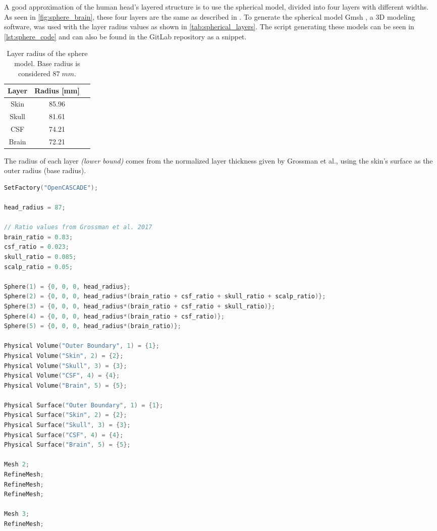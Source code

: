 A good approximation of the human head's layered structure is to use the spherical model, divided into four layers with different widths. As seen in \autoref{fig:sphere_brain}, these four layers are the same as described in . To generate the spherical model Gmsh \cite{gmsh}, a 3D modeling software, was used with the layer radius values as shown in \autoref{tab:spherical_layers}. The script generating these models can be seen in \autoref{lst:sphere_code} and can also be found in the GitLab repository \cite{thesis_repo} as a snippet.
\begin{table}[!ht]
\begin{minipage}{.62\linewidth}
\centering
\caption{Layer radius of the sphere model. Base radius is considered $87\;\si{mm}$.}
\label{tab:spherical_layers}
\begin{tabular}{|c|c|c|}
\hline
\rowcolor[HTML]{C0C0C0} 
{\color[HTML]{000000} \textbf{Layer}} & {\color[HTML]{000000} \textbf{Radius {[}mm{]}}} \\ \hline
Skin & 85.96 \\ \hline
Skull & 81.61 \\ \hline
CSF & 74.21 \\ \hline
Brain & 72.21 \\ \hline
\end{tabular}
\end{minipage}
\end{table}

\noindent The radius of each layer \textit{(lower bound)} comes from the normalized layer thickness given by Grossman et al.\cite[Figure S2, J, and K]{Grossman2017}, using the skin's surface as the outer radius (base radius).

\begin{lstlisting}[language=C,caption={Sphere \gls{CAD} model generation code in \texttt{geo} format},captionpos=b, label=lst:sphere_code]
SetFactory("OpenCASCADE");

head_radius = 87;

// Ratio values from Grossman et al. 2017
brain_ratio = 0.83;
csf_ratio = 0.023;
skull_ratio = 0.085;
scalp_ratio = 0.05;

Sphere(1) = {0, 0, 0, head_radius};
Sphere(2) = {0, 0, 0, head_radius*(brain_ratio + csf_ratio + skull_ratio + scalp_ratio)};
Sphere(3) = {0, 0, 0, head_radius*(brain_ratio + csf_ratio + skull_ratio)};
Sphere(4) = {0, 0, 0, head_radius*(brain_ratio + csf_ratio)};
Sphere(5) = {0, 0, 0, head_radius*(brain_ratio)};

Physical Volume("Outer Boundary", 1) = {1};
Physical Volume("Skin", 2) = {2};
Physical Volume("Skull", 3) = {3};
Physical Volume("CSF", 4) = {4};
Physical Volume("Brain", 5) = {5};

Physical Surface("Outer Boundary", 1) = {1};
Physical Surface("Skin", 2) = {2};
Physical Surface("Skull", 3) = {3};
Physical Surface("CSF", 4) = {4};
Physical Surface("Brain", 5) = {5};

Mesh 2;
RefineMesh;
RefineMesh;
RefineMesh;

Mesh 3;
RefineMesh;
\end{lstlisting}

